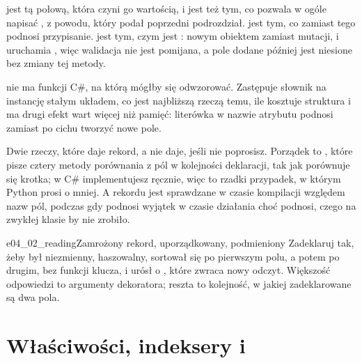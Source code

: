 


\noindent
{} jest tą połową, która czyni go wartością, i jest też
tym, co pozwala  w ogóle napisać , z
powodu, który podał poprzedni podrozdział.
 jest tym, co zamiast tego podnosi przypisanie.  jest tym, czym jest
: nowym obiektem zamiast mutacji, i uruchamia
, więc walidacja nie jest pomijana, a pole dodane
później jest niesione bez zmiany tej metody.

 nie ma funkcji C\#, na którą mógłby się odwzorować.
Zastępuje słownik na instancję stałym układem, co jest najbliższą rzeczą
temu, ile kosztuje struktura \dash{} i ma drugi efekt wart więcej niż
pamięć: literówka w nazwie atrybutu podnosi  zamiast
po cichu tworzyć nowe pole.

\begin{csbox}
Dwie rzeczy, które daje rekord, a  nie daje, jeśli nie
poprosisz. Porządek to , które pisze cztery metody
porównania z pól w kolejności deklaracji, tak jak porównuje się krotka; w
C\# implementujesz  ręcznie, więc to rzadki przypadek,
w którym Python prosi o mniej. A  rekordu jest sprawdzane w
czasie kompilacji względem nazw pól, podczas gdy 
podnosi wyjątek w czasie działania \dash{} choć podnosi, czego
 na zwykłej klasie by nie zrobiło.
\end{csbox}

\begin{exercise}{e04_02_reading}{Zamrożony rekord, uporządkowany, podmieniony}
Zadeklaruj  tak, żeby był niezmienny, haszowalny, sortował
się po pierwszym polu, a potem po drugim, bez funkcji klucza, i urósł o
, które zwraca nowy odczyt. Większość odpowiedzi to
argumenty dekoratora; reszta to kolejność, w jakiej zadeklarowane są dwa
pola.
\end{exercise}

\section{Właściwości, indeksery i \texorpdfstring{}{IEnumerable}}
\label{sec:ch04-properties}

